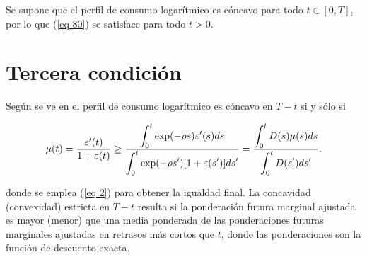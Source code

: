 Se supone que el perfil de consumo logarítmico es cóncavo para todo $t \in [0, T]$, por lo que (\ref{eq 80}) se satisface para todo $t>0$. %


\section{Tercera condición}
Según se ve en \parencite{feigenbaum2021deviation} el perfil de consumo logarítmico es cóncavo en $T - t$ si y sólo si

\begin{equation}
\label{eq 86}  
\mu(t)= \dfrac{\varepsilon'(t)}{1+ \varepsilon(t)} \geq \dfrac{\displaystyle \int_0^t \exp (-\rho s) \varepsilon'(s) ds}{\displaystyle \int_0^t \exp (-\rho s') [1+\varepsilon(s')] ds'}= \dfrac{\displaystyle  \int_0^t D(s) \mu(s) ds}{\displaystyle \int_0^t D(s')ds'}.
\end{equation}

\noindent donde se emplea (\ref{eq 2}) para obtener la igualdad final. La concavidad (convexidad) estricta en $T - t$ resulta si la ponderación futura marginal ajustada es mayor (menor) que una media ponderada de las ponderaciones futuras marginales ajustadas en retrasos más cortos que $t$, donde las ponderaciones son la función de descuento exacta. %

